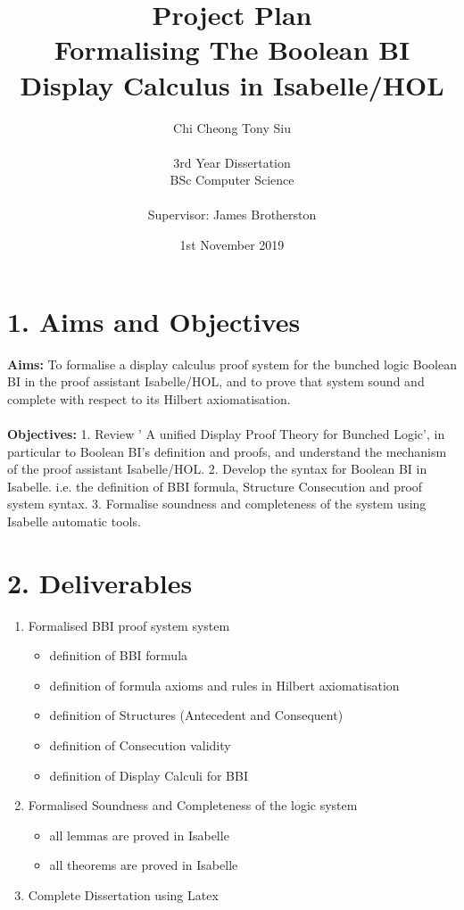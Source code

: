 \documentclass{report}
\title{Project Plan \\ Formalising The Boolean BI Display Calculus in Isabelle/HOL}
\author{Chi Cheong Tony Siu \\ \\ 3rd Year Dissertation\\ 
BSc Computer Science\\ \\
Supervisor: James Brotherston}
\date{1st November 2019}							%
\begin{document}
\maketitle
\setcounter{page}{1}

\section*{1. Aims and Objectives}

\Large \textbf {Aims:} To formalise a display calculus proof system for the bunched logic Boolean BI in the proof assistant Isabelle/HOL, and to prove that system sound and complete with respect to its Hilbert axiomatisation. \\ \\
\textbf {Objectives:}  1. Review ' A unified Display Proof Theory for Bunched Logic', in particular to Boolean BI's definition and proofs, and understand the mechanism of the proof assistant Isabelle/HOL. 2. Develop the syntax for Boolean BI in Isabelle. i.e. the definition of  BBI formula, Structure Consecution and proof system syntax. 3. Formalise soundness and completeness of the system using Isabelle automatic tools.

\section*{2. Deliverables} 
\begin{enumerate}
	\item Formalised BBI proof system system
		\begin{itemize}
    			 \item definition of BBI formula
			 \item definition of formula axioms and rules in Hilbert axiomatisation
			 \item definition of Structures (Antecedent and Consequent)
			 \item definition of Consecution validity
			 \item definition of Display Calculi for BBI
		\end{itemize}
	\item Formalised Soundness and Completeness of the logic system
		\begin{itemize}
			\item all lemmas are proved in Isabelle
			\item all theorems are proved in Isabelle
		\end{itemize}
	\item Complete Dissertation using Latex
\end{enumerate}
\end{document}
